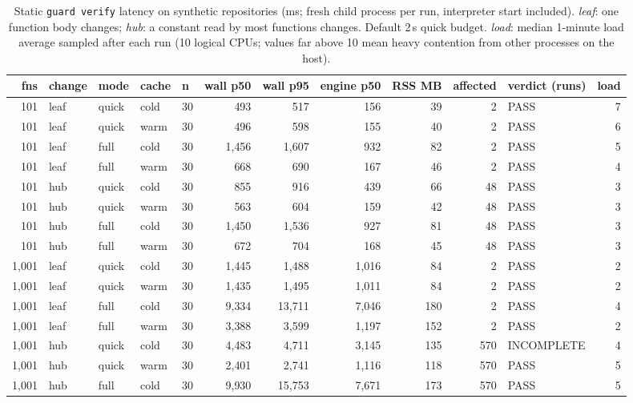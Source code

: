 \begin{table}[h!]
\centering
\footnotesize
\setlength{\tabcolsep}{4pt}
\caption{Static \texttt{guard verify} latency on synthetic repositories (ms; fresh child process per run, interpreter start included). \emph{leaf}: one function body changes; \emph{hub}: a constant read by most functions changes. Default 2\,s quick budget. \emph{load}: median 1-minute load average sampled after each run (10 logical CPUs; values far above 10 mean heavy contention from other processes on the host).}
\label{tab:latency}
\begin{tabular}{rllllrrrrrlr}
\toprule
fns & change & mode & cache & n & wall p50 & wall p95 & engine p50 & RSS MB & affected & verdict (runs) & load \\
\midrule
101 & leaf & quick & cold & 30 & 493 & 517 & 156 & 39 & 2 & PASS & 7 \\
101 & leaf & quick & warm & 30 & 496 & 598 & 155 & 40 & 2 & PASS & 6 \\
101 & leaf & full & cold & 30 & 1{,}456 & 1{,}607 & 932 & 82 & 2 & PASS & 5 \\
101 & leaf & full & warm & 30 & 668 & 690 & 167 & 46 & 2 & PASS & 4 \\
101 & hub & quick & cold & 30 & 855 & 916 & 439 & 66 & 48 & PASS & 3 \\
101 & hub & quick & warm & 30 & 563 & 604 & 159 & 42 & 48 & PASS & 3 \\
101 & hub & full & cold & 30 & 1{,}450 & 1{,}536 & 927 & 81 & 48 & PASS & 3 \\
101 & hub & full & warm & 30 & 672 & 704 & 168 & 45 & 48 & PASS & 3 \\
1{,}001 & leaf & quick & cold & 30 & 1{,}445 & 1{,}488 & 1{,}016 & 84 & 2 & PASS & 2 \\
1{,}001 & leaf & quick & warm & 30 & 1{,}435 & 1{,}495 & 1{,}011 & 84 & 2 & PASS & 2 \\
1{,}001 & leaf & full & cold & 30 & 9{,}334 & 13{,}711 & 7{,}046 & 180 & 2 & PASS & 4 \\
1{,}001 & leaf & full & warm & 30 & 3{,}388 & 3{,}599 & 1{,}197 & 152 & 2 & PASS & 2 \\
1{,}001 & hub & quick & cold & 30 & 4{,}483 & 4{,}711 & 3{,}145 & 135 & 570 & INCOMPLETE & 4 \\
1{,}001 & hub & quick & warm & 30 & 2{,}401 & 2{,}741 & 1{,}116 & 118 & 570 & PASS & 5 \\
1{,}001 & hub & full & cold & 30 & 9{,}930 & 15{,}753 & 7{,}671 & 173 & 570 & PASS & 5 \\

\end{tabular}
\end{table}
